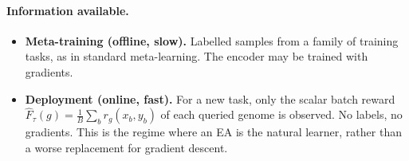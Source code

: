 \documentclass[11pt,a4paper]{article}
\theoremstyle{definition}
\theoremstyle{plain}
\theoremstyle{remark}
\begin{document}
\paragraph{Information available.}
\begin{itemize}
\item \textbf{Meta-training (offline, slow).} Labelled samples from a family of training tasks, as in standard meta-learning. The encoder may be trained with gradients.
\item \textbf{Deployment (online, fast).} For a new task, only the scalar batch reward $\hat F_\tau(g) = \frac1B\sum_{b} r_g(x_b,y_b)$ of each queried genome is observed. No labels, no gradients. This is the regime where an EA is the natural learner, rather than a worse replacement for gradient descent.
\end{itemize}
\end{document}
